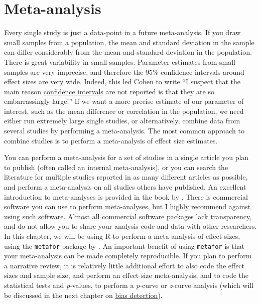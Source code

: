 \documentclass[
  oneside]{krantz}
\begin{document}
\hypertarget{meta}{%
\chapter{Meta-analysis}\label{meta}}

Every single study is just a data-point in a future meta-analysis. If you draw small samples from a population, the mean and standard deviation in the sample can differ considerably from the mean and standard deviation in the population. There is great variability in small samples. Parameter estimates from small samples are very imprecise, and therefore the 95\% confidence intervals around effect sizes are very wide. Indeed, this led Cohen \citeyearpar{cohen_earth_1994} to write ``I suspect that the main reason \protect\hyperlink{confint}{confidence intervals} are not reported is that they are so embarrassingly large!'' If we want a more precise estimate of our parameter of interest, such as the mean difference or correlation in the population, we need either run extremely large single studies, or alternatively, combine data from several studies by performing a meta-analysis. The most common approach to combine studies is to perform a meta-analysis of effect size estimates.

You can perform a meta-analysis for a set of studies in a single article you plan to publish (often called an internal meta-analysis), or you can search the literature for multiple studies reported in as many different articles as possible, and perform a meta-analysis on all studies others have published. An excellent introduction to meta-analyses is provided in the book by \citet{borenstein_introduction_2009}. There is commercial software you can use to perform meta-analyses, but I highly recommend against using such software. Almost all commercial software packages lack transparency, and do not allow you to share your analysis code and data with other researchers. In this chapter, we will be using R to perform a meta-analysis of effect sizes, using the \texttt{metafor} package by \citet{viechtbauer_conducting_2010}. An important benefit of using \texttt{metafor} is that your meta-analysis can be made completely reproducible. If you plan to perform a narrative review, it is relatively little additional effort to also code the effect sizes and sample size, and perform an effect size meta-analysis, and to code the statistical tests and \emph{p}-values, to perform a \emph{p}-curve or \emph{z}-curve analysis (which will be discussed in the next chapter on \protect\hyperlink{bias}{bias detection}).
\end{document}
